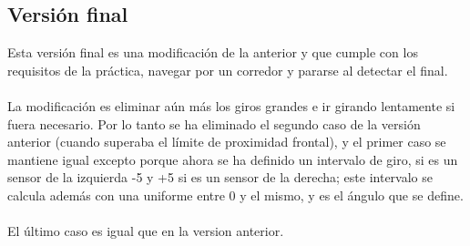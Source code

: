 \documentclass[14pt]{extarticle}
\theoremstyle{definition}
\theoremstyle{remark}
\begin{document}
\subsection{Versión final}\label{subsec:versionfinal}
Esta versión final es una modificación de la anterior y que cumple con los requisitos de la práctica, navegar por un corredor y pararse al detectar el final.\\\\
La modificación es eliminar aún más los giros grandes e ir girando lentamente si fuera necesario. Por lo tanto se ha eliminado el segundo caso de la versión anterior (cuando superaba el límite de proximidad frontal), y el primer caso se mantiene igual excepto porque ahora se ha definido un intervalo de giro, si es un sensor de la izquierda -5 y +5 si es un sensor de la derecha; este intervalo se calcula además con una uniforme entre 0 y el mismo, y es el ángulo que se define.\\\\El último caso es igual que en la version anterior.
\end{document}
